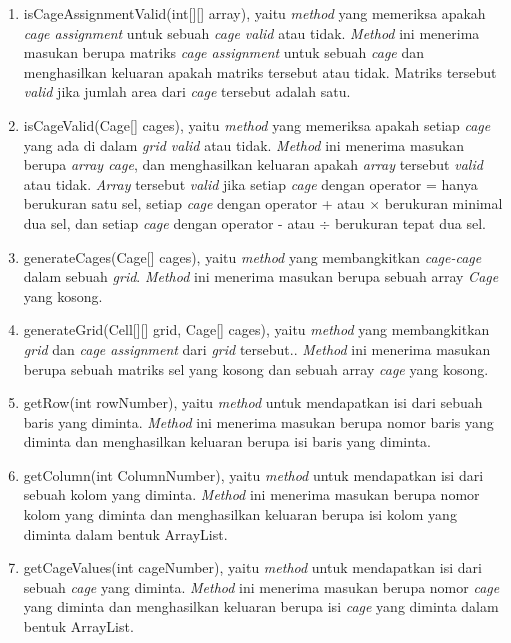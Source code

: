\begin{enumerate}
\item isCageAssignmentValid(int[][] array), yaitu \textit{method} yang memeriksa apakah \textit{cage assignment} untuk sebuah \textit{cage valid} atau tidak. \textit{Method} ini menerima masukan berupa matriks \textit{cage assignment} untuk sebuah \textit{cage} dan menghasilkan keluaran apakah matriks tersebut atau tidak. Matriks tersebut \textit{valid} jika jumlah area dari \textit{cage} tersebut adalah satu.
\item isCageValid(Cage[] cages), yaitu \textit{method} yang memeriksa apakah setiap \textit{cage} yang ada di dalam \textit{grid valid} atau tidak. \textit{Method} ini menerima masukan berupa \textit{array cage}, dan menghasilkan keluaran apakah \textit{array} tersebut \textit{valid} atau tidak. \textit{Array} tersebut \textit{valid} jika setiap \textit{cage} dengan operator = hanya berukuran satu sel, setiap \textit{cage} dengan operator + atau \begin{math}\times\end{math} berukuran minimal dua sel, dan setiap \textit{cage} dengan operator - atau \begin{math}\div\end{math} berukuran tepat dua sel.
\item generateCages(Cage[] cages), yaitu \textit{method} yang membangkitkan \textit{cage-cage} dalam sebuah \textit{grid}. \textit{Method} ini menerima masukan berupa sebuah array \textit{Cage} yang kosong.
\item generateGrid(Cell[][] grid, Cage[] cages), yaitu \textit{method} yang membangkitkan \textit{grid} dan \textit{cage assignment} dari \textit{grid} tersebut.. \textit{Method} ini menerima masukan berupa sebuah matriks sel yang kosong dan sebuah array \textit{cage} yang kosong.
\item getRow(int rowNumber), yaitu \textit{method} untuk mendapatkan isi dari sebuah baris yang diminta. \textit{Method} ini menerima masukan berupa nomor baris yang diminta dan menghasilkan keluaran berupa isi baris yang diminta.
\item getColumn(int ColumnNumber), yaitu \textit{method} untuk mendapatkan isi dari sebuah kolom yang diminta. \textit{Method} ini menerima masukan berupa nomor kolom yang diminta dan menghasilkan keluaran berupa isi kolom yang diminta dalam bentuk ArrayList.
\item getCageValues(int cageNumber), yaitu \textit{method} untuk mendapatkan isi dari sebuah \textit{cage} yang diminta. \textit{Method} ini menerima masukan berupa nomor \textit{cage} yang diminta dan menghasilkan keluaran berupa isi \textit{cage} yang diminta dalam bentuk ArrayList.

\end{enumerate}
